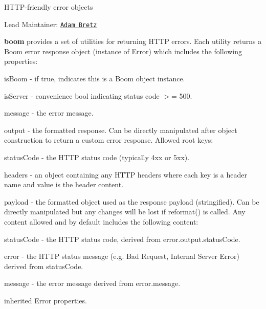 

H\+T\+T\+P-\/friendly error objects

\href{http://travis-ci.org/hapijs/boom}{\tt } \href{https://www.npmjs.com/package/boom}{\tt }

Lead Maintainer\+: \href{https://github.com/arb}{\tt Adam Bretz}

{\bfseries boom} provides a set of utilities for returning H\+T\+TP errors. Each utility returns a {\ttfamily Boom} error response object (instance of {\ttfamily Error}) which includes the following properties\+:
\begin{DoxyItemize}
\item {\ttfamily is\+Boom} -\/ if {\ttfamily true}, indicates this is a {\ttfamily Boom} object instance.
\item {\ttfamily is\+Server} -\/ convenience bool indicating status code $>$= 500.
\item {\ttfamily message} -\/ the error message.
\item {\ttfamily output} -\/ the formatted response. Can be directly manipulated after object construction to return a custom error response. Allowed root keys\+:
\begin{DoxyItemize}
\item {\ttfamily status\+Code} -\/ the H\+T\+TP status code (typically 4xx or 5xx).
\item {\ttfamily headers} -\/ an object containing any H\+T\+TP headers where each key is a header name and value is the header content.
\item {\ttfamily payload} -\/ the formatted object used as the response payload (stringified). Can be directly manipulated but any changes will be lost if {\ttfamily reformat()} is called. Any content allowed and by default includes the following content\+:
\begin{DoxyItemize}
\item {\ttfamily status\+Code} -\/ the H\+T\+TP status code, derived from {\ttfamily error.\+output.\+status\+Code}.
\item {\ttfamily error} -\/ the H\+T\+TP status message (e.\+g. \textquotesingle{}Bad Request\textquotesingle{}, \textquotesingle{}Internal Server Error\textquotesingle{}) derived from {\ttfamily status\+Code}.
\item {\ttfamily message} -\/ the error message derived from {\ttfamily error.\+message}.
\end{DoxyItemize}
\end{DoxyItemize}
\item inherited {\ttfamily Error} properties.
\end{DoxyItemize}

